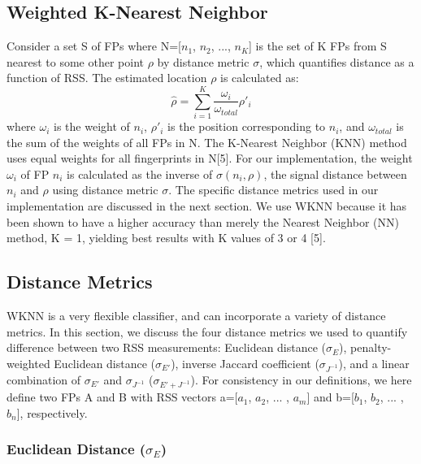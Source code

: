 \documentclass[conference]{IEEEtran}
\begin{document}
\subsection{Weighted K-Nearest Neighbor}
\indent Consider a set S of FPs  where N=[$n_1$, $n_2$, ..., $n_K$] is the set of K FPs from S nearest to some other point $\rho$ by distance metric $\sigma$, which quantifies distance as a function of RSS. The estimated location $\rho$ is calculated as:
\begin{equation}
\label{wknn}
\hat{\rho} = \sum\limits_{i=1}^{K}\frac{\omega_i}{\omega_{total}}\rho'_i
\end{equation}
where $\omega_i$ is the weight of $n_i$, $\rho'_i$ is the position corresponding to $n_i$, and $\omega_{total}$ is the sum of the weights of all FPs in N. The K-Nearest Neighbor (KNN) method uses equal weights for all fingerprints in N[5]. For our implementation, the weight $\omega_i$ of FP $n_i$ is calculated as the inverse of $\sigma(n_i, \rho)$, the signal distance between $n_i$ and $\rho$ using distance metric $\sigma$. The specific distance metrics used in our implementation are discussed in the next section. We use WKNN because it has been shown to have a higher accuracy than merely the Nearest Neighbor (NN) method, K = 1, yielding best results with K values of 3 or 4 [5]. 

\subsection{Distance Metrics}
WKNN is a very flexible classifier, and can incorporate a variety of distance metrics. In this section, we discuss the four distance metrics we used to quantify difference between two RSS measurements: Euclidean distance ($\sigma_E$), penalty-weighted Euclidean distance ($\sigma_{E'}$), inverse Jaccard coefficient ($\sigma_{J^{-1}}$), and a linear combination of $\sigma_{E'}$ and $\sigma_{J^{-1}}$ ($\sigma_{E' + J^{-1}}$). For consistency in our definitions, we here define two FPs A and B with RSS vectors a=[$a_1$, $a_2$, ... , $a_m$] and b=[$b_1$, $b_2$, ... , $b_n$], respectively. 

\subsubsection{Euclidean Distance ($\sigma_E$)}
\end{document}
